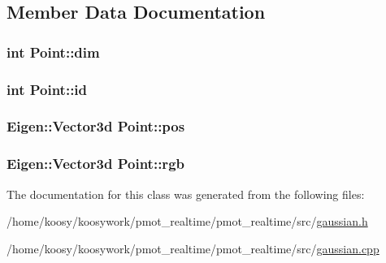 \subsection{\-Member \-Data \-Documentation}
\hypertarget{class_point_ad506f1484a4c9a0ba5e1d40019584de9}{
\subsubsection[{dim}]{\setlength{\rightskip}{0pt plus 5cm}int {\bf \-Point\-::dim}}}\label{class_point_ad506f1484a4c9a0ba5e1d40019584de9}
\hypertarget{class_point_a3ccd2080027d6845744bd044280da9e7}{
\subsubsection[{id}]{\setlength{\rightskip}{0pt plus 5cm}int {\bf \-Point\-::id}}}\label{class_point_a3ccd2080027d6845744bd044280da9e7}
\hypertarget{class_point_ae84efd1582c7c76ba5b8afbe5b4f6149}{
\subsubsection[{pos}]{\setlength{\rightskip}{0pt plus 5cm}\-Eigen\-::\-Vector3d {\bf \-Point\-::pos}}}\label{class_point_ae84efd1582c7c76ba5b8afbe5b4f6149}
\hypertarget{class_point_aa6a6084434d35335bc8074e34013ebe1}{
\subsubsection[{rgb}]{\setlength{\rightskip}{0pt plus 5cm}\-Eigen\-::\-Vector3d {\bf \-Point\-::rgb}}}\label{class_point_aa6a6084434d35335bc8074e34013ebe1}


\-The documentation for this class was generated from the following files\-:\begin{DoxyCompactItemize}
\item 
/home/koosy/koosywork/pmot\-\_\-realtime/pmot\-\_\-realtime/src/\hyperlink{gaussian_8h}{gaussian.\-h}\item 
/home/koosy/koosywork/pmot\-\_\-realtime/pmot\-\_\-realtime/src/\hyperlink{gaussian_8cpp}{gaussian.\-cpp}\end{DoxyCompactItemize}
